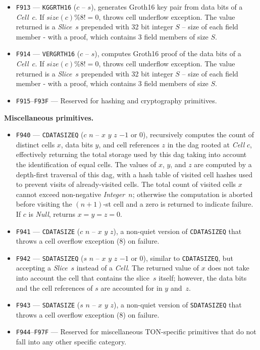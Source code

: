 \documentclass[12pt,oneside]{article}
\def\makepoint#1{\medbreak\noindent{\bf #1.\ }}
\def\nxsubpoint{\refstepcounter{subsubsection}%
    \smallbreak\makepoint{\thesubsubsection}}
\def\emb#1{\textbf{#1.}}
\begin{document}
\begin{itemize}
\item {\tt F913} --- {\tt KGGRTH16} ($c$ -- $s$), generates Groth16 key pair from data bits of a {\em
Cell\/}~$c$. If $size(c) \% 8 != 0$, throws cell underflow exception. The value returned is a {\em Slice\/}~$s$
prepended with 32 bit integer $S$ – size of each field member - with a proof, which contains 3 field members of size $S$.
\item {\tt F914} --- {\tt VERGRTH16} ($c$ -- $s$), computes Groth16 proof of the data bits of a {\em Cell\/}~$c$.
If $size(c) \% 8 != 0$, throws cell underflow exception. The value returned is a {\em Slice\/}~$s$ prepended with
32 bit integer $S$ – size of each field member - with a proof, which contains 3 field members of size $S$.
\item {\tt F915}--{\tt F93F} --- Reserved for hashing and cryptography primitives.
\end{itemize}

\nxsubpoint\emb{Miscellaneous primitives}
\begin{itemize}
\item {\tt F940} --- {\tt CDATASIZEQ} ($c$ $n$ -- $x$ $y$ $z$ $-1$ or $0$), recursively computes the count of distinct cells $x$, data bits $y$, and cell references $z$ in the dag rooted at {\em Cell\/} $c$, effectively returning the total storage used by this dag taking into account the identification of equal cells. The values of $x$, $y$, and $z$ are computed by a depth-first traversal of this dag, with a hash table of visited cell hashes used to prevent visits of already-visited cells. The total count of visited cells $x$ cannot exceed non-negative {\em Integer\/}~$n$; otherwise the computation is aborted before visiting the $(n+1)$-st cell and a zero is returned to indicate failure. If $c$ is {\em Null}, returns $x=y=z=0$.
\item {\tt F941} --- {\tt CDATASIZE} ($c$ $n$ -- $x$ $y$ $z$), a non-quiet version of {\tt CDATASIZEQ} that throws a cell overflow exception (8) on failure.
\item {\tt F942} --- {\tt SDATASIZEQ} ($s$ $n$ -- $x$ $y$ $z$ $-1$ or $0$), similar to {\tt CDATASIZEQ}, but accepting a {\em Slice\/}~$s$ instead of a {\em Cell\/}. The returned value of $x$ does not take into account the cell that contains the slice~$s$ itself; however, the data bits and the cell references of $s$ are accounted for in $y$ and~$z$.
\item {\tt F943} --- {\tt SDATASIZE} ($s$ $n$ -- $x$ $y$ $z$), a non-quiet version of {\tt SDATASIZEQ} that throws a cell overflow exception (8) on failure.
\item {\tt F944}--{\tt F97F} --- Reserved for miscellaneous TON-specific primitives that do not fall into any other specific category.
\end{itemize}
\end{document}
